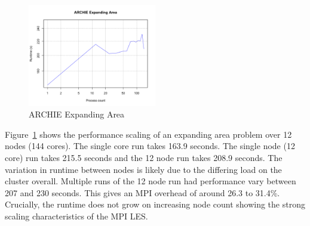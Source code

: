 \begin{figure}
    \includegraphics[width=0.5\textwidth]{graphs/ARCHIE-expanding-area.png}
    \caption{ARCHIE Expanding Area}
    \label{fig:archieexpandingarea}
\end{figure}

Figure~\ref{fig:archieexpandingarea} shows the performance scaling of an
expanding area problem over 12 nodes (144 cores). The single core run takes
163.9 seconds. The single node (12 core) run takes 215.5 seconds and the 12 node
run takes 208.9 seconds. The variation in runtime between nodes is likely due to
the differing load on the cluster overall. Multiple runs of the 12 node run had
performance vary between 207 and 230 seconds. This gives an MPI overhead of
around 26.3 to 31.4\%. Crucially, the runtime does not grow on increasing node
count showing the strong scaling characteristics of the MPI LES.
